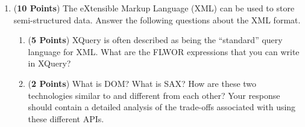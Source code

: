 \documentclass[12pt]{article}
\begin{document}
\begin{enumerate}



 
\newpage

\item ({\bf 10 Points}) The eXtensible Markup Language (XML) can be used to store semi-structured data.  Answer the
  following questions about the XML format. 

  \begin{enumerate}
    
    \item ({\bf 5 Points}) XQuery is often described as being the ``standard'' query language for XML.  What are the
      FLWOR expressions that you can write in XQuery?

      \item ({\bf 2 Points}) What is DOM?  What is SAX?  How are these two technologies similar to and different from
        each other?  Your response should contain a detailed analysis of the trade-offs associated with using these
        different APIs.


\end{enumerate}
\end{enumerate}
\end{document}
